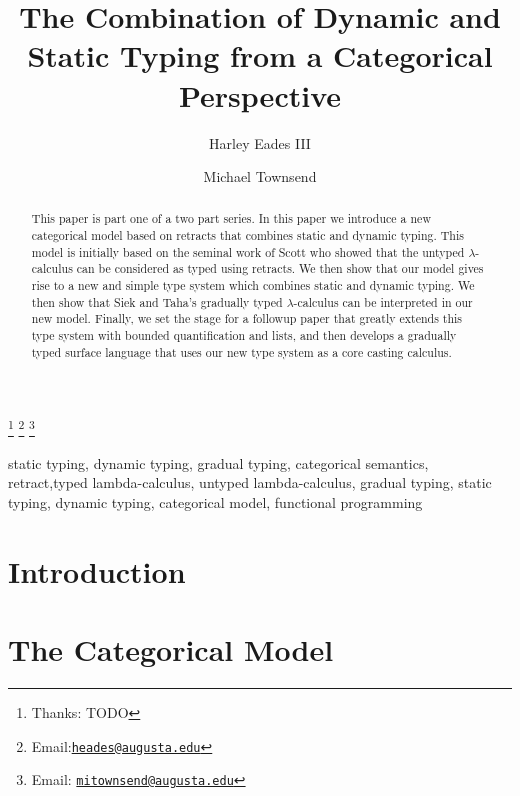 \documentclass{entcs}
\begin{document}
\begin{frontmatter}
  \title{The Combination of Dynamic and Static Typing from a Categorical Perspective}
  \author{Harley Eades III}
  \address{Computer and Information Sciences\\ Augusta University\\
    Augusta, USA}
  \author{Michael Townsend}
  \address{Computer and Information Sciences\\ Augusta University\\
    Augusta, USA}

  \thanks[ALL]{Thanks: TODO}
  \thanks[myemail]{Email:\href{mailto:heades@augusta.edu} {\texttt{\normalshape heades@augusta.edu}}}
  \thanks[coemail]{Email: \href{mailto:mitownsend@augusta.edu} {\texttt{\normalshape mitownsend@augusta.edu}}}
  \begin{abstract} 
    This paper is part one of a two part series.  In this paper we
    introduce a new categorical model based on retracts that combines
    static and dynamic typing.  This model is initially based on the
    seminal work of Scott who showed that the untyped
    $\lambda$-calculus can be considered as typed using retracts.  We
    then show that our model gives rise to a new and simple type
    system which combines static and dynamic typing.  We then show
    that Siek and Taha's gradually typed $\lambda$-calculus can be
    interpreted in our new model.  Finally, we set the stage for a
    followup paper that greatly extends this type system with bounded
    quantification and lists, and then develops a gradually typed
    surface language that uses our new type system as a core casting
    calculus.
  \end{abstract}
  \begin{keyword}  
    static typing, dynamic typing, gradual typing, categorical
    semantics, retract,typed lambda-calculus, untyped lambda-calculus,
    gradual typing, static typing, dynamic typing, categorical model,
    functional programming
  \end{keyword}
\end{frontmatter}

\section{Introduction}
\label{sec:introduction}


\section{The Categorical Model}
\label{subsec:the_categorical_model}

\end{document}
